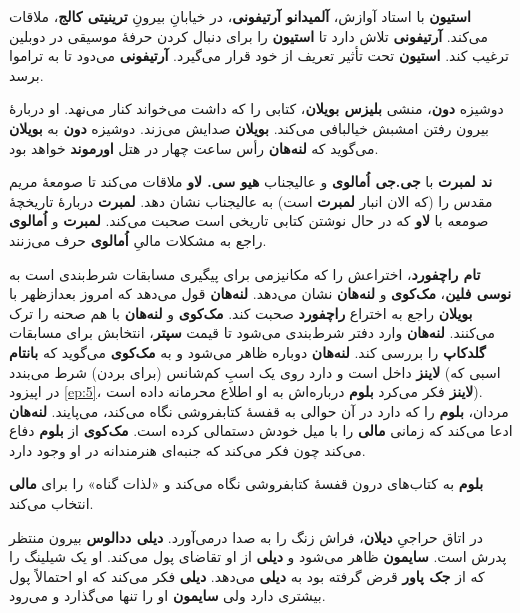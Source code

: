 \documentclass[12pt]{book}
\newcommand{\noun}[1]{{\textbf{#1}}}
\begin{document}
    \noun{استیون} با استاد آوازش، \noun{آلمیدانو آرتیفونی}، در خیابانِ بیرونِ \noun{ترینیتی کالج}، ملاقات می‌کند. \noun{آرتیفونی} تلاش دارد تا \noun{استیون} را برای دنبال کردن حرفهٔ موسیقی در دوبلین ترغیب کند. \noun{استیون} تحت تأثیر تعریف از خود قرار می‌گیرد. \noun{آرتیفونی} می‌دود تا به تراموا برسد.

    دوشیزه \noun{دون}، منشی \noun{بلیزس بویلان‬}، کتابی را که داشت می‌خواند کنار می‌نهد. او دربارهٔ بیرون رفتن امشبش خیالبافی می‌کند. \noun{بویلان} صدایش می‌زند. دوشیزه \noun{دون} به \noun{بویلان} می‌گوید که \noun{لنه‌هان} رأس ساعت چهار در هتل \noun{اورموند} خواهد بود.

    \noun{ند لمبرت} با \noun{جی.جی اُمالوی} و عالیجناب \noun{هیو سی. لاو} ملاقات می‌کند تا صومعهٔ مریم مقدس را (که الان انبار \noun{لمبرت} است) به عالیجناب نشان دهد. \noun{لمبرت} دربارهٔ تاریخچهٔ صومعه با \noun{لاو} که در حال نوشتن کتابی تاریخی است صحبت می‌کند. \noun{لمبرت} و \noun{اُمالوی} راجع به مشکلات مالیِ \noun{اُمالوی} حرف می‌زنند.

    \noun{تام راچفورد}، اختراعش را که مکانیزمی برای پیگیری مسابقات شرط‌بندی است به \noun{نوسی فلین}، \noun{مک‌کوی} و \noun{لنه‌هان} نشان می‌دهد. \noun{لنه‌هان} قول می‌دهد که امروز بعدازظهر با \noun{بویلان} راجع به اختراع \noun{راچفورد} صحبت کند. \noun{مک‌کوی} و \noun{لنه‌هان} با هم صحنه را ترک می‌کنند. \noun{لنه‌هان} وارد دفتر شرط‌بندی می‌شود تا قیمت \noun{سپتر}، انتخابش برای مسابقات \noun{گلدکاپ} را بررسی کند. \noun{لنه‌هان} دوباره ظاهر می‌شود و به \noun{مک‌کوی} می‌گوید که \noun{بانتام لاینز} داخل است و دارد روی یک اسبِ کم‌شانس (برای بردن) شرط می‌بندد (اسبی که در اپیزود \ref{ep:5}، \noun{لاینز} فکر می‌کرد \noun{بلوم} درباره‌اش به او اطلاع محرمانه داده است). مردان، \noun{بلوم} را که دارد در آن حوالی به قفسهٔ کتابفروشی نگاه می‌کند، می‌پایند. \noun{لنه‌هان} ادعا می‌کند که زمانی \noun{مالی} را با میل خودش دستمالی کرده است. \noun{مک‌کوی} از \noun{بلوم} دفاع می‌کند چون فکر می‌کند که جنبه‌ای هنرمندانه در او وجود دارد.

    \noun{بلوم} به کتاب‌های درون قفسهٔ کتابفروشی نگاه می‌کند و «لذات گناه» را برای \noun{مالی} انتخاب می‌کند.

    در اتاق حراجیِ \noun{دیلان}، فراش زنگ را به صدا درمی‌آورد. \noun{دیلی ددالوس} بیرون منتظر پدرش است. \noun{سایمون}  ظاهر می‌شود و \noun{دیلی} از او تقاضای پول می‌کند. او یک شیلینگ را که از \noun{جک پاور} قرض گرفته بود به \noun{دیلی} می‌دهد. \noun{دیلی} فکر می‌کند که او احتمالاً پول بیشتری دارد ولی \noun{سایمون}  او را تنها می‌گذارد و می‌رود.
\end{document}
